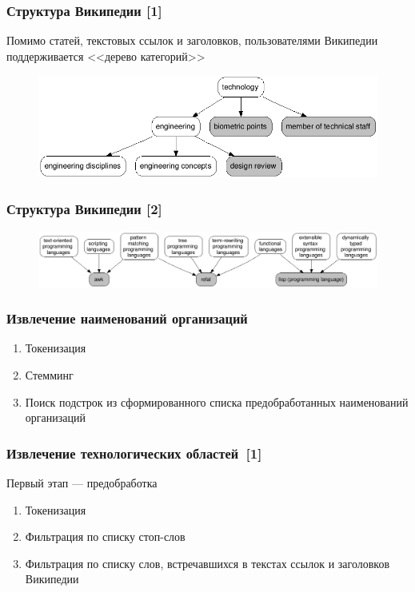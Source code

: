 \documentclass{beamer}
\begin{document}
\begin{frame}\frametitle{Структура Википедии [1]}
Помимо статей, текстовых ссылок и заголовков, пользователями Википедии поддерживается <<дерево категорий>>

\begin{figure}[ht]
\begin{center}
\includegraphics[width=4.5in]{chart_categories.png}
\end{center}
\end{figure}

\end{frame}
\begin{frame}\frametitle{Структура Википедии [2]}

\begin{figure}[ht]
\begin{center}
\includegraphics[width=4.5in]{chart_languages.png}
\end{center}
\end{figure}
\end{frame}



\begin{frame}\frametitle{Извлечение наименований организаций}
\begin{enumerate}
\item Токенизация
\item Стемминг
\item Поиск подстрок из сформированного списка предобработанных наименований организаций
\end{enumerate}
\end{frame}

\begin{frame}\frametitle{Извлечение технологических областей~[1]}
Первый этап --- предобработка
        \begin{enumerate}
		\item Токенизация
		\item Фильтрация по списку стоп-слов
		\item Фильтрация по списку слов, встречавшихся в текстах ссылок и заголовков Википедии
        \end{enumerate}

\end{frame}
\end{document}
